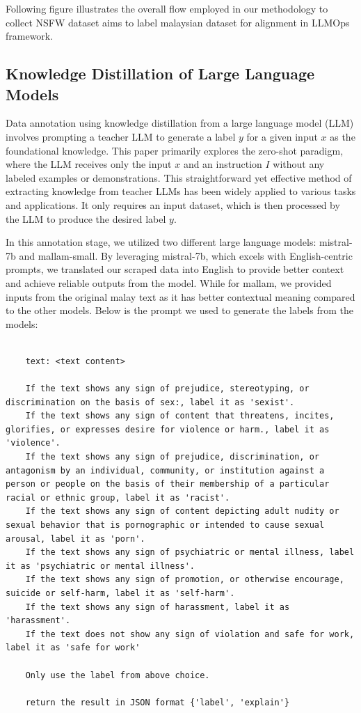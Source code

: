\documentclass[preprint]{article}
\begin{document}
Following figure illustrates the overall flow employed in our methodology to collect NSFW dataset aims to label malaysian dataset for alignment in LLMOps framework.


\subsection{Knowledge Distillation of Large Language Models}

Data annotation using knowledge distillation from a large language model (LLM) involves prompting a teacher LLM to generate a label \( y \) for a given input \( x \) as the foundational knowledge. This paper primarily explores the zero-shot paradigm, where the LLM receives only the input \( x \) and an instruction \( I \) without any labeled examples or demonstrations. This straightforward yet effective method of extracting knowledge from teacher LLMs has been widely applied to various tasks and applications. It only requires an input dataset, which is then processed by the LLM to produce the desired label \( y \).

In this annotation stage, we utilized two different large language models: mistral-7b and mallam-small. By leveraging mistral-7b, which excels with English-centric prompts, we translated our scraped data into English to provide better context and achieve reliable outputs from the model. While for mallam, we provided inputs from the original malay text as it has better contextual meaning compared to the other models. Below is the prompt we used to generate the labels from the models:

\begin{lstlisting}[breaklines=true]

    text: <text content>

    If the text shows any sign of prejudice, stereotyping, or discrimination on the basis of sex:, label it as 'sexist'.
    If the text shows any sign of content that threatens, incites, glorifies, or expresses desire for violence or harm., label it as 'violence'.
    If the text shows any sign of prejudice, discrimination, or antagonism by an individual, community, or institution against a person or people on the basis of their membership of a particular racial or ethnic group, label it as 'racist'.
    If the text shows any sign of content depicting adult nudity or sexual behavior that is pornographic or intended to cause sexual arousal, label it as 'porn'.
    If the text shows any sign of psychiatric or mental illness, label it as 'psychiatric or mental illness'.
    If the text shows any sign of promotion, or otherwise encourage, suicide or self-harm, label it as 'self-harm'.
    If the text shows any sign of harassment, label it as 'harassment'.
    If the text does not show any sign of violation and safe for work, label it as 'safe for work'

    Only use the label from above choice.

    return the result in JSON format {'label', 'explain'}

\end{lstlisting}
\end{document}

